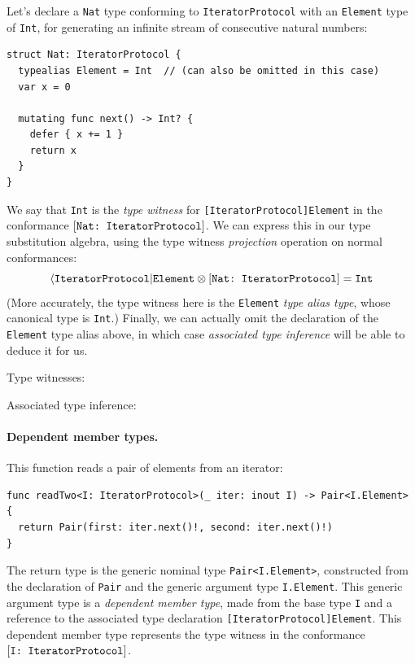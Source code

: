 \documentclass[../generics]{subfiles}
\begin{document}
Let's declare a \texttt{Nat} type conforming to \texttt{IteratorProtocol} with an \texttt{Element} type of \texttt{Int}, for generating an infinite stream of consecutive natural numbers:
\begin{Verbatim}
struct Nat: IteratorProtocol {
  typealias Element = Int  // (can also be omitted in this case)
  var x = 0

  mutating func next() -> Int? {
    defer { x += 1 }
    return x
  }
}
\end{Verbatim}
We say that \texttt{Int} is the \emph{type witness} for \texttt{[IteratorProtocol]Element} in the conformance $[\texttt{Nat:~IteratorProtocol}]$. We can express this in our type substitution algebra, using the type witness \emph{projection} operation on normal conformances:
\[\langle\texttt{IteratorProtocol}|\texttt{Element}\otimes [\texttt{Nat:~IteratorProtocol}] = \texttt{Int}\]
(More accurately, the type witness here is the \texttt{Element} \emph{type alias type}, whose canonical type is \texttt{Int}.) Finally, we can actually omit the declaration of the \texttt{Element} type alias above, in which case \emph{associated type inference} will be able to deduce it for us.

\begin{MoreDetails}
\item Type witnesses: 
\item Associated type inference: 
\end{MoreDetails}

\paragraph{Dependent member types.} This function reads a pair of elements from an iterator:
\begin{Verbatim}
func readTwo<I: IteratorProtocol>(_ iter: inout I) -> Pair<I.Element> {
  return Pair(first: iter.next()!, second: iter.next()!)
}
\end{Verbatim}
The return type is the generic nominal type \texttt{Pair<I.Element>}, constructed from the declaration of \texttt{Pair} and the generic argument type \texttt{I.Element}. This generic argument type is a \emph{dependent member type}, made from the base type \texttt{I} and a reference to the associated type declaration \texttt{[IteratorProtocol]Element}. This dependent member type represents the type witness in the conformance $[\texttt{I:~IteratorProtocol}]$.
\end{document}
